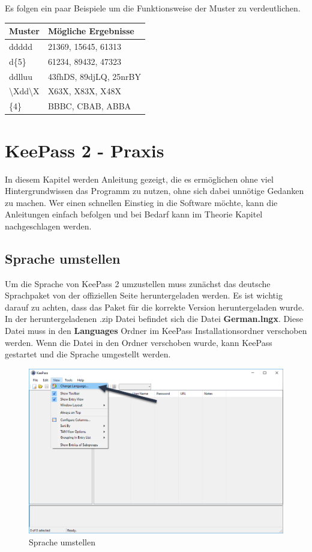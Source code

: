 \documentclass[12pt,a4paper]{scrreprt}
\begin{document}
\noindent Es folgen ein paar Beispiele um die Funktionsweise der Muster zu verdeutlichen.

\begin{center}
\begin{tabular}{|l|l|}
Muster&Mögliche Ergebnisse\\\hline
ddddd&21369, 15645, 61313\\
d\{{}5\}{}&61234, 89432, 47323\\
ddlluu&43fhDS, 89djLQ, 25nrBY\\
\textbackslash{}Xdd\textbackslash{}X&X63X, X83X, X48X\\
\{{}4\}{}&BBBC, CBAB, ABBA\\
\end{tabular}
\end{center}

\chapter{KeePass 2 - Praxis}
In diesem Kapitel werden Anleitung gezeigt, die es ermöglichen ohne viel Hintergrundwissen das Programm zu nutzen, ohne sich dabei unnötige Gedanken zu machen. Wer einen schnellen Einstieg in die Software möchte, kann die Anleitungen einfach befolgen und bei Bedarf kann im Theorie Kapitel nachgeschlagen werden.

\section{Sprache umstellen}
Um die Sprache von KeePass 2 umzustellen muss zunächst das deutsche Sprachpaket von der offiziellen Seite heruntergeladen werden. Es ist wichtig darauf zu achten, dass das Paket für die korrekte Version heruntergeladen wurde. In der heruntergeladenen .zip Datei befindet sich die Datei \textbf{German.lngx}. Diese Datei muss in den \textbf{Languages} Ordner im KeePass Installationsordner verschoben werden. Wenn die Datei in den Ordner verschoben wurde, kann KeePass gestartet und die Sprache umgestellt werden.

\begin{figure}[h]
\begin{center}
\includegraphics[width=350pt]{media/klanguage.png}
\caption{Sprache umstellen}
\label{klanguage}
\end{center}
\end{figure}
\end{document}
